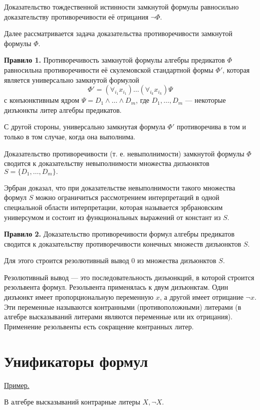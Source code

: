 Доказательство тождественной истинности замкнутой формулы  равносильно доказательству противоречивости её отрицания $\neg \Phi$.

Далее рассматривается задача доказательства противоречивости замкнутой формулы $\Phi$.

{\bf Правило 1.} Противоречивость замкнутой формулы алгебры предикатов $\Phi$ равносильна противоречивости её скулемовской стандартной формы $\Phi'$, которая является универсально замкнутой формулой
\begin{equation*}
    \Phi' = (\forall_{i_1}x_{i_1})\dots(\forall_{i_k}x_{i_k})\Psi
\end{equation*}
с конъюнктивным ядром $\Psi = D_1\land\dots\land D_m$, где $D_1,\dots,D_m$ --- некоторые дизъюнкты литер алгебры предикатов.

С другой стороны, универсально замкнутая формула $\Phi'$ противоречива в том и только в том случае, когда она выполнима.

Доказательство противоречивости (т. е. невыполнимости) замкнутой формулы $\Phi$ сводится к доказательству невыполнимости множества дизъюнктов $S = \{D_1,\dots,D_m\}.$

Эрбран доказал, что при доказательстве невыполнимости такого множества формул $S$ можно ограничиться рассмотрением интерпретаций в одной специальной области интерпретации, которая называется эрбрановским универсумом и состоит из функциональных выражений от констант из $S$.

{\bf Правило 2.} Доказательство противоречивости формул алгебры предикатов сводится к доказательству противоречивости конечных множеств дизъюнктов $S$.

Для этого строится резолютивный вывод 0 из множества дизъюнктов $S$.

Резолютивный вывод --- это последовательность дизъюнкций, в которой строится резольвента формул. Резольвента применялась к двум дизъюнктам. Один дизъюнкт имеет пропорциональную переменную $x$, а другой имеет отрицание $\neg x$. Эти переменные называются контранными (противоположными) литерами (в алгебре высказываний литерами являются переменные или их отрицания). Применение резольвенты есть сокращение контранных литер.

\section{Унификаторы формул}

\underline{Пример.}

В алгебре высказываний контрарные литеры $X, \neg X$.

